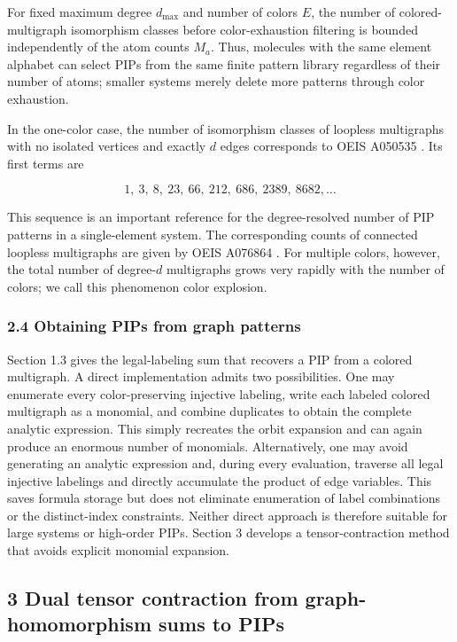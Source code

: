 For fixed maximum degree \(d_{\max}\) and number of colors \(E\), the number of colored-multigraph isomorphism classes before color-exhaustion filtering is bounded independently of the atom counts \(M_a\). Thus, molecules with the same element alphabet can select PIPs from the same finite pattern library regardless of their number of atoms; smaller systems merely delete more patterns through color exhaustion.

In the one-color case, the number of isomorphism classes of loopless multigraphs with no isolated vertices and exactly \(d\) edges corresponds to OEIS A050535 \cite{OEISA050535}. Its first terms are

\[
1,\ 3,\ 8,\ 23,\ 66,\ 212,\ 686,\ 2389,\ 8682,\ldots
\]

This sequence is an important reference for the degree-resolved number of PIP patterns in a single-element system. The corresponding counts of connected loopless multigraphs are given by OEIS A076864 \cite{OEISA076864}. For multiple colors, however, the total number of degree-\(d\) multigraphs grows very rapidly with the number of colors; we call this phenomenon color explosion.

\subsubsection{2.4 Obtaining PIPs from graph patterns}\label{sec:patterns-to-pips}

Section 1.3 gives the legal-labeling sum that recovers a PIP from a colored multigraph. A direct implementation admits two possibilities. One may enumerate every color-preserving injective labeling, write each labeled colored multigraph as a monomial, and combine duplicates to obtain the complete analytic expression. This simply recreates the orbit expansion and can again produce an enormous number of monomials. Alternatively, one may avoid generating an analytic expression and, during every evaluation, traverse all legal injective labelings and directly accumulate the product of edge variables. This saves formula storage but does not eliminate enumeration of label combinations or the distinct-index constraints. Neither direct approach is therefore suitable for large systems or high-order PIPs. Section 3 develops a tensor-contraction method that avoids explicit monomial expansion.

\subsection{3 Dual tensor contraction from graph-homomorphism sums to PIPs}\label{sec:dual-tensor}

